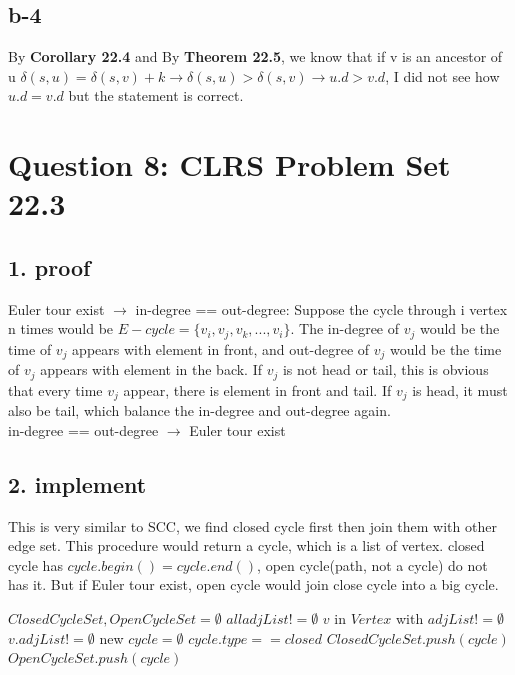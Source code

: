 \documentclass[]{article}
\begin{document}
\subsection{b-4}

By \textbf{Corollary 22.4} and By \textbf{Theorem 22.5}, we know that if v is an ancestor of u $\delta (s, u) = \delta(s, v) + k \rightarrow \delta(s, u) > \delta (s, v) \rightarrow u.d > v.d$, I did not see how $u.d = v.d$ but the statement is correct.

\section{Question 8: CLRS Problem Set 22.3}


\subsection{1. proof}

Euler tour exist $\rightarrow$ in-degree == out-degree: Suppose the cycle through i vertex n times would be $E-cycle = \{ v_{i}, v_{j}, v_{k}, ... , v_{i} \}$. The in-degree of $v_{j}$ would be the time of  $v_{j}$ appears with element in front, and out-degree of $v_{j}$ would be the time of $v_{j}$ appears with element in the back. If $v_{j}$ is not head or tail, this is obvious that every time $v_{j}$ appear, there is element in front and tail. If $v_{j}$ is head, it must also be tail, which balance the in-degree and out-degree again.\\

in-degree == out-degree $\rightarrow$ Euler tour exist

\subsection{2. implement}

This is very similar to SCC, we find closed cycle first then join them with other edge set. This procedure would return a cycle, which is a list of vertex. closed cycle has $cycle.begin() = cycle.end()$, open cycle(path, not a cycle) do not has it. But if Euler tour exist, open cycle would join close cycle into a big cycle.

\begin{codebox}
	
	\li $ClosedCycleSet, OpenCycleSet = \emptyset$
	\li \While $all adjList != \emptyset$ \Do
	\li \For $v$ in $Vertex$ with $adjList != \emptyset$\Do
	\li \If $v.adjList != \emptyset$ \Then
	\li new $cycle = \emptyset$
	\li {}
	\li \If $cycle.type == closed$
	\li \Then $ClosedCycleSet.push(cycle)$
	\li \Else $OpenCycleSet.push(cycle)$
	
\end{codebox}
\end{document}
